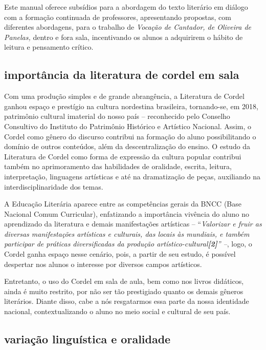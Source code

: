 \documentclass[12pt]{extarticle}
\begin{document}
Este manual oferece subsídios para a abordagem do texto literário em
diálogo com a formação continuada de professores, apresentando
propostas, com diferentes abordagens, para o trabalho de \emph{Vocação
de Cantador, de Oliveira de Panelas,} dentro e fora sala, incentivando
os alunos a adquirirem o hábito de leitura e pensamento crítico.

\subsection{importância da literatura de cordel em sala}

Com uma produção simples e de grande abrangência, a Literatura de Cordel
ganhou espaço e prestígio na cultura nordestina brasileira, tornando-se,
em 2018, patrimônio cultural imaterial do nosso país -- reconhecido pelo
Conselho Consultivo do Instituto do Patrimônio Histórico e Artístico
Nacional. Assim, o Cordel como gênero do discurso contribui na formação
do aluno possibilitando o domínio de outros conteúdos, além da
descentralização do ensino. O estudo da Literatura de Cordel como forma
de expressão da cultura popular contribui também no aprimoramento das
habilidades de oralidade, escrita, leitura, interpretação, linguagens
artísticas e até na dramatização de peças, auxiliando na
interdisciplinaridade dos temas.

A Educação Literária aparece entre as competências gerais da BNCC (Base
Nacional Comum Curricular), enfatizando a importância vivência do aluno
no aprendizado da literatura e demais manifestações artísticas --
``\emph{Valorizar e fruir as diversas manifestações artísticas e
culturais, das locais às mundiais, e também participar de práticas
diversificadas da produção artístico-cultural\textbf{{[}2{]}}'' --},
logo, o Cordel ganha espaço nesse cenário, pois, a partir de seu estudo,
é possível despertar nos alunos o interesse por diversos campos
artísticos.

Entretanto, o uso do Cordel em sala de aula, bem como nos livros
didáticos, ainda é muito restrito, por não ser tão prestigiado quanto os
demais gêneros literários. Diante disso, cabe a nós resgatarmos essa
parte da nossa identidade nacional, contextualizando o aluno no meio
social e cultural de seu país.


\subsection{variação linguística e oralidade}
\end{document}
